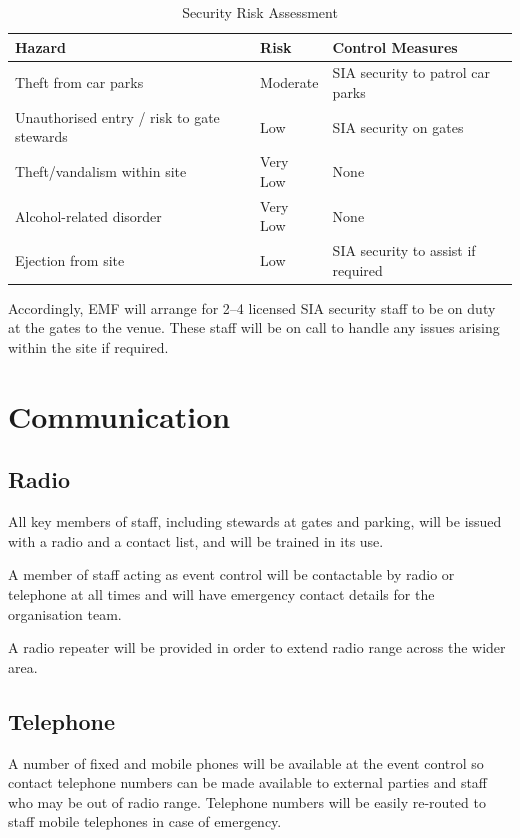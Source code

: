 \begin{table}[h!]
    \caption{Security Risk Assessment}
    \label{table:security}
    \centering
    \begin{tabular}{| l l l |}
        \hline
        \textbf{Hazard}                            & \textbf{Risk} & \textbf{Control Measures}          \\
        \hline
        Theft from car parks                       & Moderate      & SIA security to patrol car parks   \\
        Unauthorised entry / risk to gate stewards & Low           & SIA security on gates              \\
        Theft/vandalism within site                & Very Low      & None                               \\
        Alcohol-related disorder                   & Very Low      & None                               \\
        Ejection from site                         & Low           & SIA security to assist if required \\
        \hline
    \end{tabular}
\end{table}

Accordingly, EMF will arrange for 2--4 licensed SIA security staff to be on duty at the gates to the
venue. These staff will be on call to handle any issues arising within the site if required.
\newpage
\section{Communication}

\subsection{Radio}
All key members of staff, including stewards at gates and parking,
will be issued with a radio and a contact list, and will be trained in its use.

A member of staff acting as event control will be contactable by
radio or telephone at all times and will have emergency contact details for the
organisation team.

A radio repeater will be provided in order to extend radio range across the wider
area.

\subsection{Telephone}
A number of fixed and mobile phones will be available at the event control so
contact telephone numbers can be made available to external parties and staff
who may be out of radio range. Telephone numbers will be easily re-routed to
staff mobile telephones in case of emergency.

